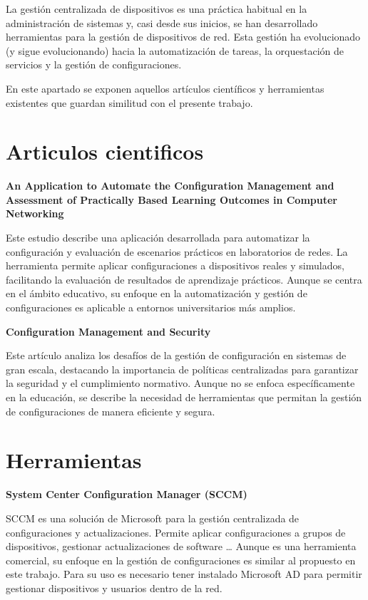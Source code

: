
La gestión centralizada de dispositivos es una práctica habitual en la administración de sistemas
y, casi desde sus inicios, se han desarrollado herramientas para la gestión de dispositivos de red.
Esta gestión ha evolucionado (y sigue evolucionando) hacia la automatización de tareas, la orquestación de servicios y
la gestión de configuraciones.

En este apartado se exponen aquellos artículos científicos y herramientas existentes que guardan similitud con
el presente trabajo.

\section{Articulos cientificos}\label{sec:articulos-cientificos}

\textbf{An Application to Automate the Configuration Management and Assessment of Practically Based Learning Outcomes in Computer Networking }\cite{malliarakis2019application}

Este estudio describe una aplicación desarrollada para automatizar la configuración y evaluación de escenarios prácticos
en laboratorios de redes.
La herramienta permite aplicar configuraciones a dispositivos reales y simulados, facilitando  la evaluación de
resultados de aprendizaje prácticos.
Aunque se centra en el ámbito educativo, su enfoque en la automatización y gestión de configuraciones es aplicable a
entornos universitarios más amplios.

\textbf{Configuration Management and Security }\cite{bellovin2001configuration}

Este artículo analiza los desafíos de la gestión de configuración en sistemas de gran
escala, destacando la importancia de políticas centralizadas para garantizar la seguridad y el cumplimiento normativo.
Aunque no se enfoca específicamente en la educación, se describe la necesidad de herramientas que permitan la gestión
de configuraciones de manera eficiente y segura.

\section{Herramientas}\label{sec:herramientas}

\textbf{System Center Configuration Manager (SCCM)}

SCCM\cite{microsoftConfigMgr} es una solución de Microsoft para la gestión centralizada de configuraciones y
actualizaciones.
Permite aplicar configuraciones a grupos de dispositivos, gestionar actualizaciones de software \ldots
Aunque es una herramienta comercial, su enfoque en la gestión de configuraciones es similar al
propuesto en este trabajo.
Para su uso es necesario tener instalado Microsoft AD para permitir gestionar dispositivos y usuarios dentro
de la red.

